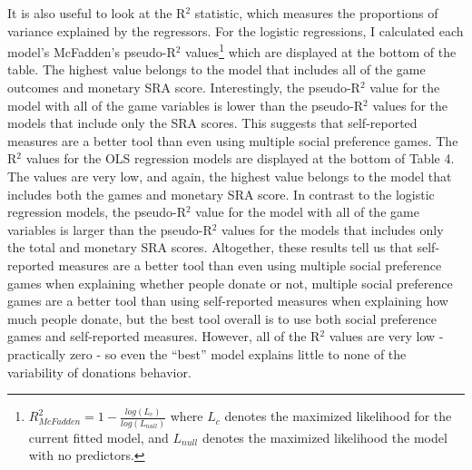 \documentclass[12pt]{article}
\begin{document}
{\color{blue} It is also useful to look at the R$^{2}$ statistic, which measures the proportions of variance explained by the regressors. For the logistic regressions, I calculated each model\rq s McFadden\rq s pseudo-R$^{2}$ values\footnote{
\(R^{2}_{McFadden} = 1 - \frac{log(L_{c})}{log(L_{null})}\)
where \(L_{c}\) denotes the maximized likelihood for the current fitted model, and \(L_{null}\) denotes the maximized likelihood the model with no predictors.
} which are displayed at the bottom of the table. The highest value belongs to the model that includes all of the game outcomes and monetary SRA score. Interestingly, the pseudo-R$^{2}$ value for the model with all of the game variables is lower than the pseudo-R$^{2}$ values for the models that include only the SRA scores. This suggests that self-reported measures are a better tool than even using multiple social preference games. The R$^{2}$ values for the OLS regression models are displayed at the bottom of Table 4. The values are very low, and again, the highest value belongs to the model that includes both the games and monetary SRA score. In contrast to the logistic regression models, the pseudo-R$^{2}$ value for the model with all of the game variables is larger than the pseudo-R$^{2}$ values for the models that includes only the total and monetary SRA scores. Altogether, these results tell us that self-reported measures are a better tool than even using multiple social preference games when explaining whether people donate or not, multiple social preference games are a better tool than using self-reported measures when explaining how much people donate, but the best tool overall is to use both social preference games and self-reported measures. However, all of the R$^{2}$ values are very low - practically zero - so even the ``best'' model explains little to none of the variability of donations behavior.}
\end{document}
